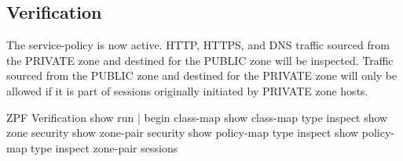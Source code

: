 \subsection{Verification}

The service-policy is now active. HTTP, HTTPS, and DNS traffic sourced from the PRIVATE zone and destined for the PUBLIC zone will be inspected. Traffic sourced from the PUBLIC zone and destined for the PRIVATE zone will only be allowed if it is part of sessions originally initiated by PRIVATE zone hosts.

\begin{sexylisting}{ZPF Verification}
show run | begin class-map
show class-map type inspect
show zone security
show zone-pair security
show policy-map type inspect
show policy-map type inspect zone-pair sessions
\end{sexylisting}


